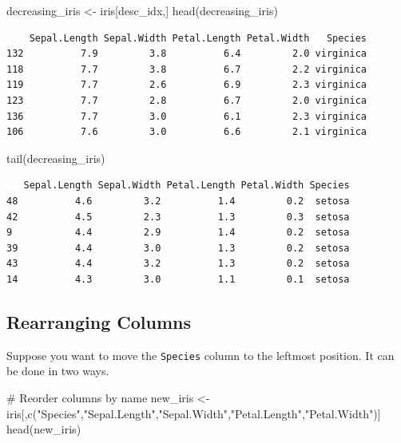 \documentclass[
  letterpaper,
  DIV=11,
  numbers=noendperiod]{scrreprt}
\newenvironment{Shaded}{\begin{snugshade}}{\end{snugshade}}
\newcommand{\CommentTok}[1]{\textcolor[rgb]{0.37,0.37,0.37}{#1}}
\newcommand{\FunctionTok}[1]{\textcolor[rgb]{0.28,0.35,0.67}{#1}}
\newcommand{\NormalTok}[1]{\textcolor[rgb]{0.00,0.23,0.31}{#1}}
\newcommand{\OtherTok}[1]{\textcolor[rgb]{0.00,0.23,0.31}{#1}}
\newcommand{\StringTok}[1]{\textcolor[rgb]{0.13,0.47,0.30}{#1}}
\begin{document}
\begin{Shaded}
\begin{Highlighting}[]
\NormalTok{decreasing\_iris }\OtherTok{\textless{}{-}}\NormalTok{ iris[desc\_idx,]}
\FunctionTok{head}\NormalTok{(decreasing\_iris)}
\end{Highlighting}
\end{Shaded}

\begin{verbatim}
    Sepal.Length Sepal.Width Petal.Length Petal.Width   Species
132          7.9         3.8          6.4         2.0 virginica
118          7.7         3.8          6.7         2.2 virginica
119          7.7         2.6          6.9         2.3 virginica
123          7.7         2.8          6.7         2.0 virginica
136          7.7         3.0          6.1         2.3 virginica
106          7.6         3.0          6.6         2.1 virginica
\end{verbatim}

\begin{Shaded}
\begin{Highlighting}[]
\FunctionTok{tail}\NormalTok{(decreasing\_iris)}
\end{Highlighting}
\end{Shaded}

\begin{verbatim}
   Sepal.Length Sepal.Width Petal.Length Petal.Width Species
48          4.6         3.2          1.4         0.2  setosa
42          4.5         2.3          1.3         0.3  setosa
9           4.4         2.9          1.4         0.2  setosa
39          4.4         3.0          1.3         0.2  setosa
43          4.4         3.2          1.3         0.2  setosa
14          4.3         3.0          1.1         0.1  setosa
\end{verbatim}

\subsection{Rearranging Columns}\label{rearranging-columns}

Suppose you want to move the \texttt{Species} column to the leftmost
position. It can be done in two ways.

\begin{Shaded}
\begin{Highlighting}[]
\CommentTok{\# Reorder columns by name}
\NormalTok{new\_iris }\OtherTok{\textless{}{-}}\NormalTok{ iris[,}\FunctionTok{c}\NormalTok{(}\StringTok{"Species"}\NormalTok{,}\StringTok{"Sepal.Length"}\NormalTok{,}\StringTok{"Sepal.Width"}\NormalTok{,}\StringTok{"Petal.Length"}\NormalTok{,}\StringTok{"Petal.Width"}\NormalTok{)]}
\FunctionTok{head}\NormalTok{(new\_iris)}
\end{Highlighting}
\end{Shaded}
\end{document}
